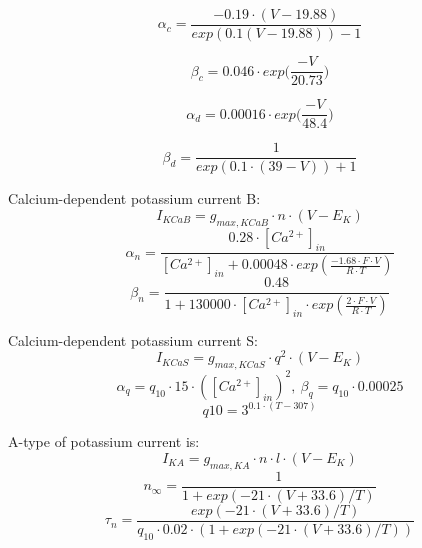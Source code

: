 \documentclass[a4paper,12pt]{article}
\begin{document}
\begin{equation}
\alpha_{c} = \frac{-0.19 \cdot (V - 19.88)}{exp(0.1(V - 19.88)) - 1}
\end{equation}

\begin{equation}
\beta_{c} = 0.046 \cdot exp \Big(\frac{-V}{20.73}\Big)
\end{equation}

\begin{equation}
\alpha_{d} = 0.00016 \cdot exp \Big(\frac{-V}{48.4}\Big)
\end{equation}

\begin{equation}
\beta_{d} = \frac{1}{exp(0.1 \cdot (39 - V)) + 1}
\end{equation}


Calcium-dependent potassium current B:
\begin{equation}
I_{KCaB} = g_{max, KCaB} \cdot n \cdot (V - E_K)
\label{eq:KvCaB}
\end{equation}
\begin{equation}
\alpha_n = \frac{0.28 \cdot [Ca^{2+}]_{in} }{ [Ca^{2+}]_{in} + 0.00048 \cdot exp(\frac{-1.68 \cdot F \cdot V}{R \cdot T})  } 
\end{equation}
\begin{equation}
\beta_n = \frac{0.48}{1 + 130000 \cdot [Ca^{2+}]_{in} \cdot exp(\frac{2 \cdot F \cdot V}{R \cdot T})}
\end{equation}

Calcium-dependent potassium current S:
\begin{equation}
\label{eq:KvCaS}
I_{KCaS} = g_{max, KCaS} \cdot q^2 \cdot (V - E_K)
\end{equation}
\begin{equation}
\alpha_q = q_{10} \cdot 15 \cdot ([Ca^{2+}]_{in})^2 , \  \beta_q = q_{10} \cdot 0.00025
\end{equation}
\begin{equation}
q10 = 3^{0.1\cdot (T - 307) } 
\end{equation}

A-type of potassium current is:
\begin{equation}
\label{eq:KvA}
I_{KA} = g_{max, KA} \cdot n \cdot l \cdot (V - E_K)
\end{equation}
\begin{equation}
n_{\infty} = \frac{1}{1 + exp(-21 \cdot (V + 33.6)/T)}
\end{equation}
\begin{equation}
\tau_n = \frac{exp(-21 \cdot (V + 33.6)/T) }
{q_{10} \cdot 0.02 \cdot (1 + exp(-21 \cdot (V + 33.6)/T))}
\end{equation}
\end{document}
